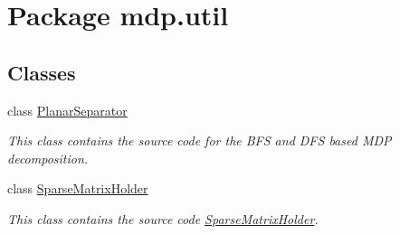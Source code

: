 \hypertarget{namespacemdp_1_1util}{}\section{Package mdp.\+util}
\label{namespacemdp_1_1util}
\subsection*{Classes}
\begin{DoxyCompactItemize}
\item 
class \hyperlink{classmdp_1_1util_1_1_planar_separator}{Planar\+Separator}
\begin{DoxyCompactList}\small\item\em This class contains the source code for the B\+F\+S and D\+F\+S based M\+D\+P decomposition. \end{DoxyCompactList}\item 
class \hyperlink{classmdp_1_1util_1_1_sparse_matrix_holder}{Sparse\+Matrix\+Holder}
\begin{DoxyCompactList}\small\item\em This class contains the source code \hyperlink{classmdp_1_1util_1_1_sparse_matrix_holder}{Sparse\+Matrix\+Holder}. \end{DoxyCompactList}\end{DoxyCompactItemize}
